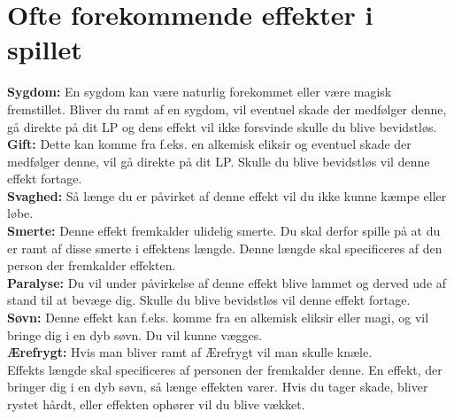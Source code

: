 \section*{Ofte forekommende effekter i spillet}
\textbf{Sygdom:} En sygdom kan være naturlig forekommet eller være magisk fremstillet. Bliver du ramt af en sygdom, vil eventuel skade der medfølger denne, gå direkte på dit LP og dens effekt vil ikke forsvinde skulle du blive bevidstløs.\\
\textbf{Gift:} Dette kan komme fra f.eks. en alkemisk eliksir og eventuel skade der medfølger denne, vil gå direkte på dit LP. Skulle du blive bevidstløs vil denne effekt fortage.\\
\textbf{Svaghed:} Så længe du er påvirket af denne effekt vil du ikke kunne kæmpe eller løbe.\\
\textbf{Smerte:} Denne effekt fremkalder ulidelig smerte. Du skal derfor spille på at du er ramt af disse smerte i effektens længde. Denne længde skal specificeres af den person der fremkalder effekten.\\
\textbf{Paralyse:} Du vil under påvirkelse af denne effekt blive lammet og derved ude af stand til at bevæge dig. Skulle du blive bevidstløs vil denne effekt fortage.\\
\textbf{Søvn:} Denne effekt kan f.eks. komme fra en alkemisk eliksir eller magi, og vil bringe dig i en dyb søvn. Du vil kunne vægges.\\
\textbf{Ærefrygt:} Hvis man bliver ramt af Ærefrygt vil man skulle knæle.\\
Effekts længde skal specificeres af personen der fremkalder denne.
En effekt, der bringer dig i en dyb søvn, så længe effekten varer. Hvis du tager skade, bliver rystet hårdt, eller effekten ophører vil du blive vækket.\\
